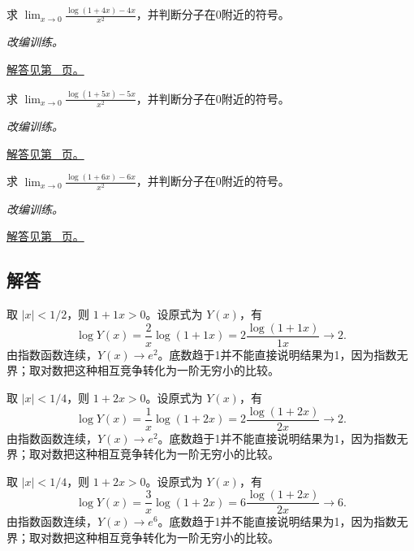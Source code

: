 \documentclass[12pt,fontset=fandol]{ctexart}
\begin{document}
\begin{example}[对数减去线性项]\label{ex:c5q22}
求 $\displaystyle\lim_{x\to0}\frac{\log(1+4x)-4x}{x^2}$，并判断分子在0附近的符号。
\par\textit{改编训练。}\par\hyperref[ans:c5q22]{解答见第~\pageref{ans:c5q22} 页。}
\end{example}
\begin{example}[对数减去线性项]\label{ex:c5q23}
求 $\displaystyle\lim_{x\to0}\frac{\log(1+5x)-5x}{x^2}$，并判断分子在0附近的符号。
\par\textit{改编训练。}\par\hyperref[ans:c5q23]{解答见第~\pageref{ans:c5q23} 页。}
\end{example}
\begin{example}[对数减去线性项]\label{ex:c5q24}
求 $\displaystyle\lim_{x\to0}\frac{\log(1+6x)-6x}{x^2}$，并判断分子在0附近的符号。
\par\textit{改编训练。}\par\hyperref[ans:c5q24]{解答见第~\pageref{ans:c5q24} 页。}
\end{example}
\subsection{解答}
\begin{solve}\label{ans:c5q1}
取 $|x|<1/2$，则 $1+1x>0$。设原式为 $Y(x)$，有
\[
\log Y(x)=\frac{2}x\log(1+1x)=2\frac{\log(1+1x)}{1x}\longrightarrow 2.
\]
由指数函数连续，$Y(x)\to e^{2}$。底数趋于1并不能直接说明结果为1，因为指数无界；取对数把这种相互竞争转化为一阶无穷小的比较。
\end{solve}

\begin{solve}\label{ans:c5q2}
取 $|x|<1/4$，则 $1+2x>0$。设原式为 $Y(x)$，有
\[
\log Y(x)=\frac{1}x\log(1+2x)=2\frac{\log(1+2x)}{2x}\longrightarrow 2.
\]
由指数函数连续，$Y(x)\to e^{2}$。底数趋于1并不能直接说明结果为1，因为指数无界；取对数把这种相互竞争转化为一阶无穷小的比较。
\end{solve}

\begin{solve}\label{ans:c5q3}
取 $|x|<1/4$，则 $1+2x>0$。设原式为 $Y(x)$，有
\[
\log Y(x)=\frac{3}x\log(1+2x)=6\frac{\log(1+2x)}{2x}\longrightarrow 6.
\]
由指数函数连续，$Y(x)\to e^{6}$。底数趋于1并不能直接说明结果为1，因为指数无界；取对数把这种相互竞争转化为一阶无穷小的比较。
\end{solve}
\end{document}
